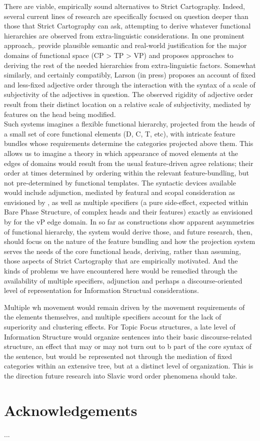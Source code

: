 \documentclass[output=paper,colorlinks,citecolor=brown,
]{langscibook}
\begin{document}
There are viable, empirically sound alternatives to Strict Cartography. Indeed, several current lines of research are specifically focused on question deeper than those that Strict Cartography can ask, attempting to derive whatever functional hierarchies are observed from extra-linguistic considerations. In one prominent approach,. \citealt{ramchand2014deriving} provide plausible semantic and real-world justification for the major domains of functional space (CP > TP > VP) and proposes approaches to deriving the rest of the needed hierarchies from extra-linguistic factors. Somewhat similarly, and certainly compatibly, Larson (in press) proposes an account of fixed and less-fixed adjective order through the interaction with the syntax of a scale of subjectivity of the adjectives in question. The observed rigidity of adjective order result from their distinct location on a relative scale of subjectivity, mediated by features on the head being modified. \\
Such systems imagines a flexible functional hierarchy, projected from the heads of a small set of core functional elements (D, C, T, etc), with intricate feature bundles whose requirements determine the categories projected above them. This allows us to imagine a theory in which appearance of moved elements at the edges of domains would result from the usual feature-driven agree relations; their order at times determined by ordering within the relevant feature-bundling, but not pre-determined by functional templates. The syntactic devices available would include adjunction, mediated by featural and scopal consideration as envisioned by \citet{Ernst2007}, as well as multiple specifiers (a pure side-effect, expected within Bare Phase Structure,  of complex heads and their features) exactly as envisioned by \citealt{Chomsky2001} for the vP edge domain. In so far as constructions show apparent asymmetries of functional hierarchy, the system would derive those, and future research, then, should focus on the nature of the feature bundling and how the projection system serves the needs of the core functional heads, deriving, rather than assuming, those aspects of Strict Cartography that are empirically motivated. And the kinds of problems we have encountered here would be remedied through the availability of multiple specifiers, adjunction and perhaps a discourse-oriented level of representation for Information Structual considerations. 
	
Multiple wh movement would remain driven by the movement requirements of the elements themselves, and multiple specifiers account for the lack of superiority and clustering effects.  For Topic Focus structures, a late level of Information Structure would organize sentences into their basic discourse-related structure, an effect that may or may not turn out to b part of the core syntax of the sentence, but would be represented not through the mediation of fixed categories within an extensive tree, but at a distinct level of organization. This is the direction future research into Slavic word order phenomena should take. 




\section*{Acknowledgements}
...

\printbibliography[heading=subbibliography,notkeyword=this]
\end{document}
